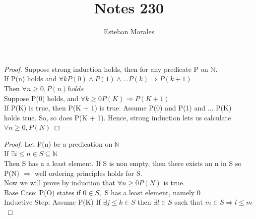 \documentclass[12pt]{article}
\newenvironment{statement}[2][Section]{\begin{trivlist}
\item[\hskip \labelsep {\bfseries #1}\hskip \labelsep {\bfseries #2.}]}{\end{trivlist}}
\begin{document}
 
%
%
 
\title{Notes 230 } %
\author{Esteban Morales} %
\maketitle


\begin{statement}{Strong induction$\Rightarrow $ standard inducion} 
\end{statement}
 
\begin{proof}  

  Suppose strong induction holds, then for any predicate P on  $\mathbb{N}$.\\
  If P(n) holds and $\forall k P(0) \land P(1) \land ... P(k) \Rightarrow P(k + 1)$\\
  Then $\forall n \ge 0, P(n) holds$\\
  Suppose P(0) holds, and $\forall k \ge 0 P(K) \Rightarrow P(K + 1)$\\
  If P(K) is true, then P(K + 1) is true. Assume P(0) and P(1) and ... P(K)\\
  holds true. So, so does P(K + 1). Hence, strong induction lets us calculate\\
  $\forall n \ge 0, P(N) $



\end{proof}


\begin{statement}{Standard induction implies well ordering principle}
  \begin{proof}
    Let P(n) be a predication on $\mathbb{N} $\\
    If $ \exists i \le n \in S \subseteq \mathbb{N}$\\
   Then S has a a least element. If S is non empty, then there exists an n in S so P(N) $\Rightarrow$ well ordering principles holds for S.\\
   Now we will prove by induction that $ \forall n \ge 0 P(N)$ is true.\\
   Base Case: P(O) states if $ 0 \in S,$ S has a least element, namely 0 \\
   Inductive Step: Assume P(K) If $\exists j \le k \in S$ then $\exists l \in S $ such that $m \in S \Rightarrow l \le m $
    


  \end{proof}


  

\end{statement}
\end{document}
